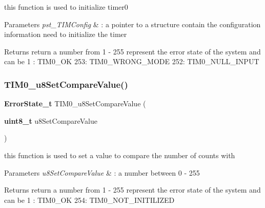 this function is used to initialize timer0 


\begin{DoxyParams}{Parameters}
{\em pst\+\_\+\+T\+I\+M\+Config} & \+: a pointer to a structure contain the configuration information need to initialize the timer \\
\hline
\end{DoxyParams}
\begin{DoxyReturn}{Returns}
return a number from 1 -\/ 255 represent the error state of the system and can be 1 \+: T\+I\+M0\+\_\+\+OK 253\+: T\+I\+M0\+\_\+\+W\+R\+O\+N\+G\+\_\+\+M\+O\+DE 252\+: T\+I\+M0\+\_\+\+N\+U\+L\+L\+\_\+\+I\+N\+P\+UT 
\end{DoxyReturn}
\mbox{\label{_t_i_m_e_r0_8c_a689d58acea491f346ef7ea249f7c98e0}} 
\subsubsection{T\+I\+M0\+\_\+u8\+Set\+Compare\+Value()}
{\footnotesize\ttfamily \textbf{ Error\+State\+\_\+t} T\+I\+M0\+\_\+u8\+Set\+Compare\+Value (\begin{DoxyParamCaption}\item[{\textbf{ uint8\+\_\+t}}]{u8\+Set\+Compare\+Value }\end{DoxyParamCaption})}



this function is used to set a value to compare the number of counts with 


\begin{DoxyParams}{Parameters}
{\em u8\+Set\+Compare\+Value} & \+: a number between 0 -\/ 255 \\
\hline
\end{DoxyParams}
\begin{DoxyReturn}{Returns}
return a number from 1 -\/ 255 represent the error state of the system and can be 1 \+: T\+I\+M0\+\_\+\+OK 254\+: T\+I\+M0\+\_\+\+N\+O\+T\+\_\+\+I\+N\+I\+T\+I\+L\+I\+Z\+ED 
\end{DoxyReturn}
\mbox{\label{_t_i_m_e_r0_8c_ab588fb0557b32e1d9b4c1c075a413c37}} 

